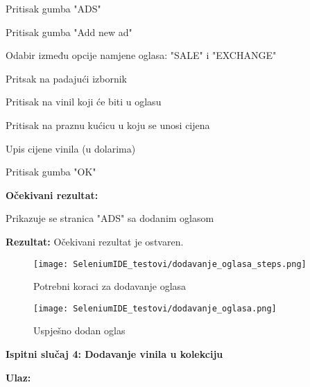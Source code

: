 					\begin{packed_enum}
					
						\item Pritisak gumba "ADS"
						\item Pritisak gumba "Add new ad"
						\item Odabir između opcije namjene oglasa: "SALE" i "EXCHANGE"
						\item Pritsak na padajući izbornik
						\item Pritisak na vinil koji će biti u oglasu
						\item Pritisak na praznu kućicu u koju se unosi cijena
						\item Upis cijene vinila (u dolarima)
						\item Pritisak gumba "OK"
												
					\end{packed_enum}
				
				\noindent\textbf{Očekivani rezultat:}
				
					\begin{packed_enum}
					
						\item Prikazuje se stranica "ADS" sa dodanim oglasom
						
					\end{packed_enum}
				
				\noindent\textbf{Rezultat:} Očekivani rezultat je ostvaren. 
				
				\begin{figure}[H]
					\texttt{[image: SeleniumIDE\_testovi/dodavanje\_oglasa\_steps.png]}
					\centering
					\caption{Potrebni koraci za dodavanje oglasa}
					\label{fig:dodavanje_oglasa_steps}
				\end{figure}
				
				\begin{figure}[H]
					\texttt{[image: SeleniumIDE\_testovi/dodavanje\_oglasa.png]}
					\centering
					\caption{Uspješno dodan oglas}
					\label{fig:ads}
				\end{figure}
				
\noindent\textbf{Ispitni slučaj 4: Dodavanje vinila u kolekciju}

				\noindent\textbf{Ulaz:}
				
